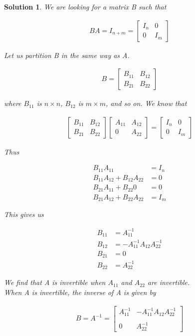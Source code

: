 \documentclass{article}
\newtheorem*{solution}{Solution}
\begin{document}
\begin{solution}
We are looking for a matrix B such that

\begin{align*}
BA = I_{n + m} = \begin{bmatrix} I_{n} & 0 \\ 0 & I_{m} \end{bmatrix}
\end{align*}

Let us partition B in the same way as A.

\begin{align*}
B = \begin{bmatrix} B_{11} & B_{12} \\ B_{21} & B_{22} \end{bmatrix}
\end{align*}

where $B_{11}$ is $n \times n$, $B_{12}$ is $m \times m$, and so on. We know that 

\begin{align*}
\begin{bmatrix} B_{11} & B_{12} \\ B_{21} & B_{22} \end{bmatrix} \begin{bmatrix} A_{11} & A_{12} \\ 0 & A_{22} \end{bmatrix} = \begin{bmatrix} I_{n} & 0 \\ 0 & I_{m} \end{bmatrix}
\end{align*}

Thus

\begin{align*}
B_{11} A_{11} &= I_{n} \\
B_{11} A_{12} + B_{12} A_{22} &= 0 \\
B_{21} A_{11} + B_{22} 0 &= 0 \\
B_{21} A_{12} + B_{22} A_{22} &= I_{m}
\end{align*}

This gives us

\begin{align*}
B_{11} &= A_{11}^{-1} \\
B_{12} & = - A_{11}^{-1} A_{12} A_{22}^{-1} \\
B_{21} &= 0 \\
B_{22} &= A_{22}^{-1}
\end{align*}

We find that A is invertible when $A_{11}$ and $A_{22}$ are invertible. \\

When A is invertible, the inverse of A is given by

\begin{align*}
B = A^{-1} = \begin{bmatrix}
A_{11}^{-1} & -A_{11}^{-1} A_{12} A_{22}^{-1} \\ \\
0 & A_{22}^{-1}
\end{bmatrix}
\end{align*}

\end{solution}
\end{document}
